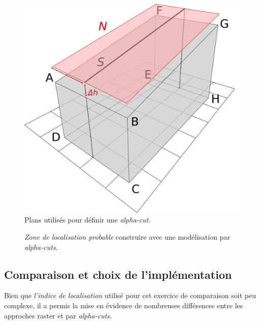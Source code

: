 \begin{figure}
  \centering
  \includegraphics[height=0.3\textheight]{../figures/polyhedre.png}
  \caption{Plans utilisés pour définir une \emph{alpha-cut.}}
  \label{fig:schema_polyhedre}
\end{figure}

\begin{figure}
  \centering
  
  \caption{\emph{Zone de localisation probable} construire avec une
    modélisation par \emph{alpha-cuts.}}
  \label{fig:AlphaCuts_zenith}
\end{figure}

\subsection{Comparaison et choix de l'implémentation}

Bien que \emph{l'indice de localisation} utilisé pour cet exercice de
comparaison soit peu complexe, il a permis la mise en évidence de
nombreuses différences entre les approches raster et par
\emph{alpha-cuts.}

